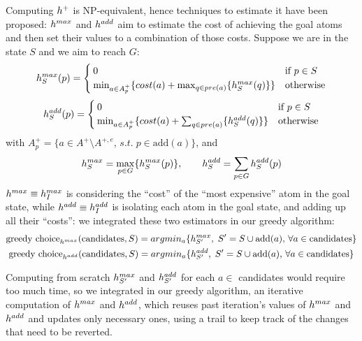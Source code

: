 Computing $h^+$ is NP-equivalent, hence techniques to estimate it have been proposed: $h^{max}$ and $h^{add}$ \cite{Bonet_01} aim to estimate the cost of achieving the goal atoms and then set their values to a combination of those costs.
Suppose we are in the state $S$ and we aim to reach $G$:
$$h^{max}_S(p)=\begin{cases}
    0&\mbox{if }p\in S\\
    \min_{a\in A^+_p}\{cost(a)+\max_{q\in pre(a)}\{h^{max}_S(q)\}\}&\mbox{otherwise}
\end{cases}$$
$$h^{add}_S(p)=\begin{cases}
    0&\mbox{if }p\in S\\
    \min_{a\in A^+_p}\{cost(a)+\sum_{q\in pre(a)}\{h^{add}_S(q)\}\}&\mbox{otherwise}
\end{cases}$$
with $A^+_p=\{a\in A^+\setminus A^{+,e},\,s.t.\;p\in\mbox{add}(a)\}$, and
$$h^{max}_S=\max_{p\in G}\{h^{max}_S(p)\},\qquad h^{add}_S=\sum_{p\in G}h^{add}_S(p)$$
$h^{max}\equiv h^{max}_I$ is considering the ``cost'' of the ``most expensive'' atom in the goal state, while $h^{add}\equiv h^{add}_I$ is isolating each atom in the goal state, and adding up all their ``costs'': we integrated these two estimators in our greedy algorithm:
\begin{gather*}
    \mbox{greedy choice}_{h^{max}}(\mbox{candidates}, S)=argmin_a\{h^{max}_{S'},\;S'=S\cup\mbox{add}(a),\,\forall a\in\mbox{candidates}\}\\
    \mbox{greedy choice}_{h^{add}}(\mbox{candidates}, S)=argmin_a\{h^{add}_{S'},\;S'=S\cup\mbox{add}(a),\,\forall a\in\mbox{candidates}\}
\end{gather*}

Computing from scratch $h^{max}_{S'}$ and $h^{add}_{S'}$ for each $a\in$ candidates would require too much time, so we integrated in our greedy algorithm, an iterative computation of $h^{max}$ and $h^{add}$, which reuses past iteration's values of $h^{max}$ and $h^{add}$ and updates only necessary ones, using a trail to keep track of the changes that need to be reverted.